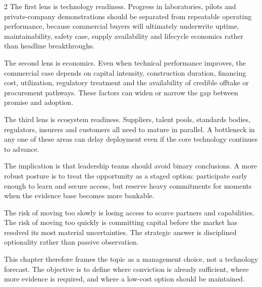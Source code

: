 \documentclass[10pt,a4paper]{article}
\begin{document}
\begin{multicols}{2}
{\small The first lens is technology readiness. Progress in laboratories, pilots and private-company demonstrations should be separated from repeatable operating performance, because commercial buyers will ultimately underwrite uptime, maintainability, safety case, supply availability and lifecycle economics rather than headline breakthroughs.}\par
{\small The second lens is economics. Even when technical performance improves, the commercial case depends on capital intensity, construction duration, financing cost, utilization, regulatory treatment and the availability of credible offtake or procurement pathways. These factors can widen or narrow the gap between promise and adoption.}\par
\end{multicols}
{\small The third lens is ecosystem readiness. Suppliers, talent pools, standards bodies, regulators, insurers and customers all need to mature in parallel. A bottleneck in any one of these areas can delay deployment even if the core technology continues to advance.}\par
{\small The implication is that leadership teams should avoid binary conclusions. A more robust posture is to treat the opportunity as a staged option: participate early enough to learn and secure access, but reserve heavy commitments for moments when the evidence base becomes more bankable.}\par
{\small The risk of moving too slowly is losing access to scarce partners and capabilities. The risk of moving too quickly is committing capital before the market has resolved its most material uncertainties. The strategic answer is disciplined optionality rather than passive observation.}\par
{\small This chapter therefore frames the topic as a management choice, not a technology forecast. The objective is to define where conviction is already sufficient, where more evidence is required, and where a low-cost option should be maintained.}\par
\label{chap:1:end}
\end{document}
